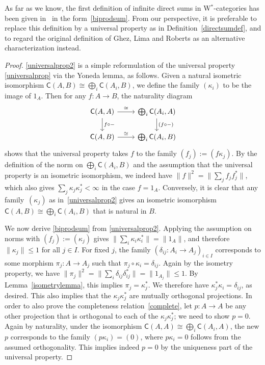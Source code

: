 \documentclass[reqno,T1,11pt]{amsproc}
\newcommand{\cat}[1]{\mathsf{#1}}		%
\newcommand{\id}[1]{1_{#1}}			%
\theoremstyle{plain}
\theoremstyle{remark}
\numberwithin{equation}{section}
\begin{document}
As far as we know, the first definition of infinite direct sums in W$^*$-categories has been given in~\cite[p.~100]{wstarcat} in the form~\ref{biprodsum}. From our perspective, it is preferable to replace this definition by a universal property as in Definition~\ref{directsumdef}, and to regard the original definition of Ghez, Lima and Roberts as an alternative characterization instead.

\begin{proof}
\ref{universalprop2} is a simple reformulation of the universal property \ref{universalprop} via the Yoneda lemma, as follows. Given a natural isometric isomorphism $\cat{C}(A,B) \cong \bigoplus_i \cat{C}(A_i,B)$, we define the family $(\kappa_i)$ to be the image of $\id{A}$. Then for any $f : A \to B$, the naturality diagram
\[\begin{tikzcd}
	\cat{C}(A,A) \ar{r}{\cong} \ar{d}{f\circ -} & \bigoplus_i \cat{C}(A_i,A) \ar{d}{(f\circ -)} \\
	\cat{C}(A,B) \ar{r}{\cong} & \bigoplus_i \cat{C}(A_i,B)
\end{tikzcd}\]
shows that the universal property takes $f$ to the family $(f_j)
:= (f\kappa_j)$. By the definition of the norm on $\bigoplus_i
\cat{C}(A_i,B)$ and the assumption that the universal property is
an isometric isomorphism, we indeed have $\| f \|^2 = \| \sum_j
f_j f_j^* \|$, which also gives $\sum_j \kappa_j \kappa_j^*
< \infty$ in the case $f = \id{A}$. Conversely, it is clear that
any family~$(\kappa_j)$ as in~\ref{universalprop2} gives an isometric
isomorphism~$\cat{C}(A,B) \cong \bigoplus_i \cat{C}(A_i,B)$ that
is natural in $B$.

We now derive \ref{biprodsum} from \ref{universalprop2}. Applying the assumption on norms with $(f_j) := (\kappa_j)$ gives $\| \sum_i \kappa_i \kappa_i^* \| = \| \id{A} \|$, and therefore $\| \kappa_j \| \leq 1$ for all $j\in I$. For fixed $j$, the family $(\delta_{ij} : A_i \to A_j)_{i\in I}$ corresponds to some morphism $\pi_j : A \to A_j$ such that $\pi_j\circ\kappa_i = \delta_{ij}$. Again by the isometry property, we have $\| \pi_j \|^2 = \| \sum_i \delta_{ij} \delta_{ij}^* \| = \| \id{A_j} \| \leq 1$. By Lemma~\ref{isometrylemma}, this implies $\pi_j = \kappa_j^*$. We therefore have $\kappa_j^*\kappa_i = \delta_{ij}$, as desired. This also implies that the $\kappa_j \kappa_j^*$ are mutually orthogonal projections. In order to also prove the completeness relation~\eqref{complete}, let $p : A\to A$ be any other projection that is orthogonal to each of the $\kappa_j \kappa_j^*$; we need to show $p = 0$. Again by naturality, under the isomorphism $\cat{C}(A,A) \cong \bigoplus_i \cat{C}(A_i,A)$, the new $p$ corresponds to the family $(p\kappa_i) = (0)$, where $p\kappa_i = 0$ follows from the assumed orthogonality. This implies indeed $p=0$ by the uniqueness part of the universal property.


\end{proof}
\end{document}
